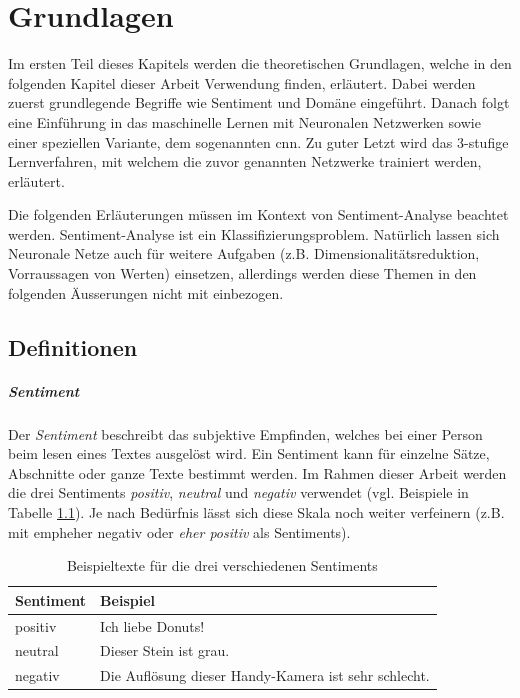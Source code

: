 \chapter{Grundlagen}
Im ersten Teil dieses Kapitels werden die theoretischen Grundlagen, welche in den folgenden Kapitel dieser Arbeit Verwendung finden, erläutert. Dabei werden zuerst grundlegende Begriffe wie Sentiment und Domäne eingeführt. Danach folgt eine Einführung in das maschinelle Lernen mit Neuronalen Netzwerken sowie einer speziellen Variante, dem sogenannten \gls{cnn}. Zu guter Letzt wird das 3-stufige Lernverfahren, mit welchem die zuvor genannten Netzwerke trainiert werden, erläutert.

Die folgenden Erläuterungen müssen im Kontext von Sentiment-Analyse beachtet werden. Sentiment-Analyse ist ein Klassifizierungsproblem. Natürlich lassen sich Neuronale Netze auch für weitere Aufgaben (z.B. Dimensionalitätsreduktion, Vorraussagen von Werten) einsetzen, allerdings werden diese Themen in den folgenden Äusserungen nicht mit einbezogen.

\section{Definitionen}
\paragraph{Sentiment}
Der \emph{Sentiment} beschreibt das subjektive Empfinden, welches bei einer Person beim lesen eines Textes ausgelöst wird. Ein Sentiment kann für einzelne Sätze, Abschnitte oder ganze Texte bestimmt werden. Im Rahmen dieser Arbeit werden die drei Sentiments \emph{positiv}, \emph{neutral} und \emph{negativ} verwendet (vgl. Beispiele in Tabelle \ref{basics:sentiments_example_table}). Je nach Bedürfnis lässt sich diese Skala noch weiter verfeinern (z.B. mit emph{eher negativ} oder \emph{eher positiv} als Sentiments).

\begin{table}[h]
  \centering
  \begin{tabular}{ll}
    \toprule
    Sentiment & Beispiel\\
    \midrule
    positiv & Ich liebe Donuts!\\
    neutral & Dieser Stein ist grau.\\
    negativ & Die Auflösung dieser Handy-Kamera ist sehr schlecht.\\
    \bottomrule
  \end{tabular}
  \caption{Beispieltexte für die drei verschiedenen Sentiments}
  \label{basics:sentiments_example_table}
\end{table}

